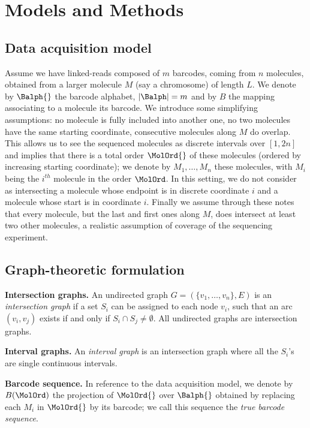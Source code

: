 \section{Models and Methods}

\subsection{Data acquisition model}

Assume we have linked-reads composed of $m$ barcodes, coming from $n$ molecules, obtained from a larger molecule $M$ (say a chromosome) of length $L$. We denote by $\Balph{}$ the barcode alphabet, $|\Balph|=m$ and by $B$ the mapping associating to a molecule its barcode.
We introduce some simplifying assumptions: no molecule is fully included into another one, no two molecules have the same starting coordinate, consecutive molecules along $M$ do overlap. 
This allows us to see the sequenced molecules as discrete intervals over $[1,2n]$ and implies that there is a total order $\MolOrd{}$ of these molecules (ordered by increasing starting coordinate); we denote by $M_1,\dots,M_n$ these molecules, with $M_i$ being the $i^{th}$ molecule in the order $\MolOrd$.
In this setting, we do not consider as intersecting a molecule whose endpoint is in discrete coordinate $i$ and a molecule whose start is in coordinate $i$.
Finally we assume through these notes that every molecule, but the last and first ones along $M$, does intersect at least two other molecules, a realistic assumption of coverage of the sequencing experiment.

\subsection{Graph-theoretic formulation}

\textbf{Intersection graphs.} An undirected graph $G=(\{v_1,\ldots,v_n\},E)$ is an \emph{intersection graph} if a set $S_i$ can be assigned to each node $v_i$, such that an arc $(v_i,v_j)$ exists if and only if $S_i \cap S_j \neq \emptyset$. All undirected graphs are intersection graphs.

\noindent \textbf{Interval graphs.} An \emph{interval graph} is an intersection graph where all the $S_i$'s are single continuous intervals.

\noindent \textbf{Barcode sequence.}
In reference to the data acquisition model, we denote by $B(\MolOrd)$ the projection of $\MolOrd{}$ over $\Balph{}$ obtained by replacing each $M_i$ in $\MolOrd{}$ by its barcode; we call this sequence the \textit{true barcode sequence}.


